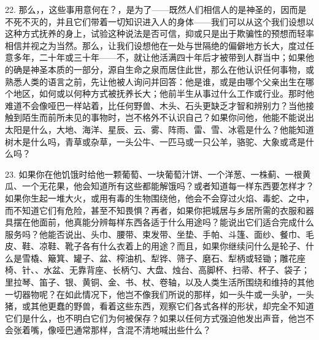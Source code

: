 22. 那么，，这些事用意何在？，是为了——既然人们相信人的是神圣的，因而是不死不灭的，并且它们带着一切知识进入人的身体——我们可以从这个我们设想以这种方式抚养的身上，试验这种说法是否可信，抑或只是出于欺骗性的预想而轻率相信并视之为当然。那么，让我们设想他在一处与世隔绝的偏僻地方长大，度过任意多年，二十年或三十年——不，就让他活满四十年后才被带到人群当中；如果他的确是神圣本质的一部分，源自生命之泉而居住此世，那么在他认识任何事物，或熟悉人类的语言之前，先让他被人询问并回答：他是谁，或是由哪个父亲出生在哪个地区，如何或以何种方式被抚养长大；他前半生从事过什么工作或行业。那时他难道不会像哑巴一样站着，比任何野兽、木头、石头更缺乏才智和辨别力？当他接触到陌生而前所未见的事物时，岂不格外不认识自己？如果你问他，他能不能说出太阳是什么，大地、海洋、星辰、云、雾、阵雨、雷、雪、冰雹是什么？他能知道树木是什么吗，青草或杂草，一头公牛、一匹马或一只公羊，骆驼、大象或鸢是什么吗？\par

23. 如果你在他饥饿时给他一颗葡萄、一块葡萄汁饼、一个洋葱、一株蓟、一根黄瓜、一个无花果，他会知道所有这些都能解饿吗？或者知道每一样东西要怎样才？如果你生起一堆大火，或用有毒的生物围绕他，他会不会穿过火焰、毒蛇、之中，而不知道它们有危险，甚至不知畏惧？再者，如果你把城居与乡居所需的衣服和器具摆在他面前，他真能分辨每样东西各适于什么用途吗？能说出它们适合完成什么服务吗？他能否说出、头巾、腰带、束发带、坐垫、手帕、斗篷、面纱、餐巾、毛皮、鞋、凉鞋、靴子各有什么衣着上的用途？而且，如果你继续问什么是轮子、什么是雪橇、簸箕、罐子、盆、榨油机、犁铧、筛子、磨石、犁柄或轻锄；雕花座椅、针、、水盆、无靠背座、长柄勺、大盘、烛台、高脚杯、扫帚、杯子、袋子；里拉琴、笛子、银、黄铜、金、书、杖、卷轴，以及人类生活所围绕和维持的其他一切器物呢？在如此情况下，他岂不像我们所说的那样，如一头牛或一头驴，一头猪，或其他更蠢的野兽，看着这些东西，观察它们各式各样的形状，却完全不知道它们是什么，也不明白它们为何被保存？如果以任何方式强迫他发出声音，他岂不会张着嘴，像哑巴通常那样，含混不清地喊出些什么？\par


